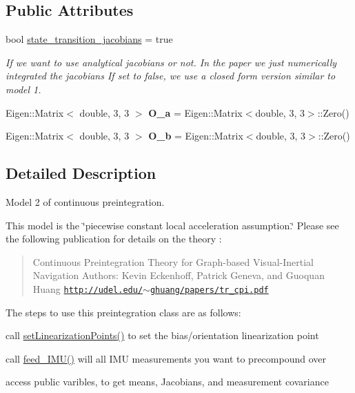 \subsection*{Public Attributes}
\begin{DoxyCompactItemize}
\item 
\mbox{\label{classov__core_1_1CpiV2_ab024c0b2d090de85e40c6c80d6bb04c3}} 
bool \hyperlink{classov__core_1_1CpiV2_ab024c0b2d090de85e40c6c80d6bb04c3}{state\+\_\+transition\+\_\+jacobians} = true
\begin{DoxyCompactList}\small\item\em If we want to use analytical jacobians or not. In the paper we just numerically integrated the jacobians If set to false, we use a closed form version similar to model 1. \end{DoxyCompactList}\item 
\mbox{\label{classov__core_1_1CpiV2_a71af3328f6ffb888c4b65139a1acdf6b}} 
Eigen\+::\+Matrix$<$ double, 3, 3 $>$ {\bfseries O\+\_\+a} = Eigen\+::\+Matrix$<$double, 3, 3$>$\+::Zero()
\item 
\mbox{\label{classov__core_1_1CpiV2_a08f8adcd49de5092c56120d83d913749}} 
Eigen\+::\+Matrix$<$ double, 3, 3 $>$ {\bfseries O\+\_\+b} = Eigen\+::\+Matrix$<$double, 3, 3$>$\+::Zero()
\end{DoxyCompactItemize}


\subsection{Detailed Description}
Model 2 of continuous preintegration. 

This model is the \char`\"{}piecewise constant local acceleration assumption.\char`\"{} Please see the following publication for details on the theory \cite{Eckenhoff2019IJRR} \+: \begin{quote}
Continuous Preintegration Theory for Graph-\/based Visual-\/\+Inertial Navigation Authors\+: Kevin Eckenhoff, Patrick Geneva, and Guoquan Huang \href{http://udel.edu/~ghuang/papers/tr_cpi.pdf}{\tt http\+://udel.\+edu/$\sim$ghuang/papers/tr\+\_\+cpi.\+pdf} \end{quote}


The steps to use this preintegration class are as follows\+:
\begin{DoxyEnumerate}
\item call \hyperlink{classov__core_1_1CpiBase_a32c11e3e61dc8a524bf48a18504b5417}{set\+Linearization\+Points()} to set the bias/orientation linearization point
\item call \hyperlink{classov__core_1_1CpiV2_a2e526d34b80061293a922fefa3a858a1}{feed\+\_\+\+I\+M\+U()} will all I\+MU measurements you want to precompound over
\item access public varibles, to get means, Jacobians, and measurement covariance 
\end{DoxyEnumerate}

